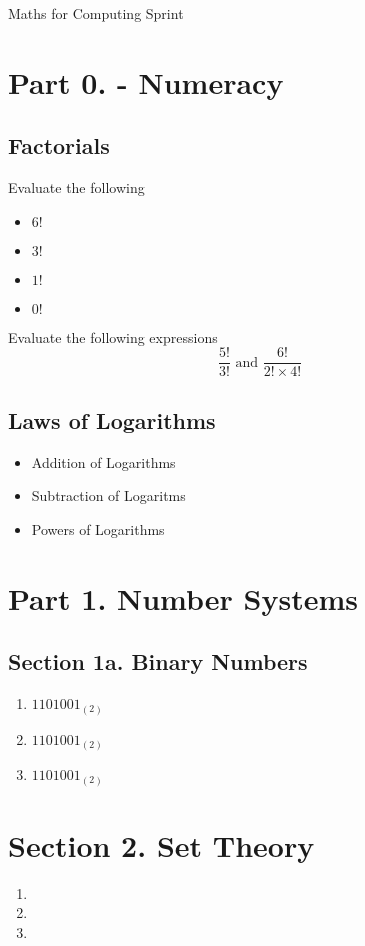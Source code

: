 
Maths for Computing Sprint

\section*{Part 0. - Numeracy}
\subsection{Factorials}
Evaluate the following
\begin{itemize}
\item $6!$
\item $3!$
\item $1!$
\item $0!$
\end{itemize}
Evaluate the following expressions
\[  \frac{5!}{3!}  \mbox{   and   } \frac{6!}{2!\times 4!}  \]
\subsection*{Laws of Logarithms}
\begin{itemize}
\item Addition of Logarithms
\item Subtraction of Logaritms
\item Powers of Logarithms
\end{itemize}
\section*{Part 1. Number Systems}

\subsection*{Section 1a. Binary Numbers}

\begin{enumerate}
\item $1101001_{(2)}$
\item $1101001_{(2)}$
\item $1101001_{(2)}$
\end{enumerate}
\section*{Section 2. Set Theory}

\begin{enumerate}
\item
\item
\item
\end{enumerate}
